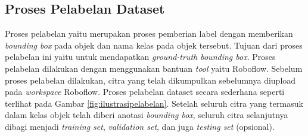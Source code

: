 \subsection{Proses Pelabelan Dataset}
\label{subsec:proseslabelling}

Proses pelabelan yaitu merupakan proses pemberian label dengan memberikan \textit{bounding box} pada objek dan nama kelas pada objek tersebut. Tujuan dari proses pelabelan ini yaitu untuk mendapatkan \textit{ground-truth bounding box}. Proses pelabelan dilakukan dengan menggunakan bantuan \textit{tool} yaitu Roboflow. Sebelum proses pelabelan dilakukan, citra yang telah dikumpulkan sebelumnya diupload pada \textit{workspace} Roboflow. Proses pelabelan dataset secara sederhana seperti terlihat pada Gambar \ref*{fig:ilustrasipelabelan}. Setelah seluruh citra yang termasuk dalam kelas objek telah diberi anotasi \textit{bounding box}, seluruh citra selanjutnya dibagi menjadi \textit{training set}, \textit{validation set}, dan juga \textit{testing set} (opsional). \par

